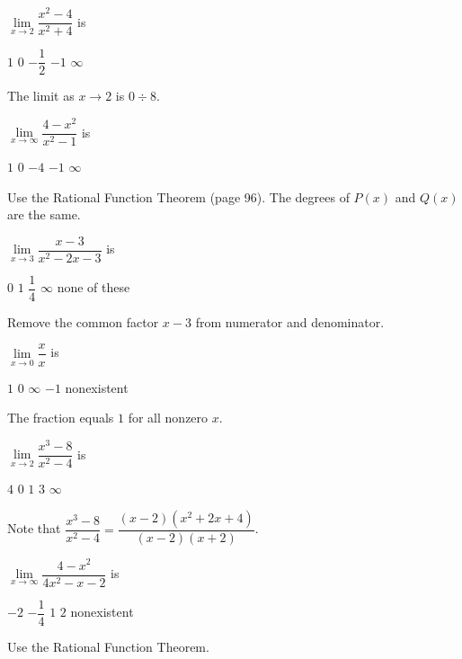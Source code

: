 \question
$\lim\limits_{x \to 2} \dfrac{x^{2}-4}{x^{2}+4}$ is
\begin{choices}
  \choice $1$
  \CorrectChoice $0$
  \choice $-\dfrac{1}{2}$
  \choice $-1$
  \choice $\infty$
\end{choices}
\begin{solution}
The limit as $x \rightarrow 2$ is $0 \div 8$.
\end{solution}

\question
$\lim\limits_{x \to \infty} \dfrac{4-x^{2}}{x^{2}-1}$ is
\begin{choices}
  \choice $1$
  \choice $0$
  \choice $-4$
  \CorrectChoice $-1$
  \choice $\infty$
\end{choices}
\begin{solution}
Use the Rational Function Theorem (page 96). The degrees of $P(x)$ and $Q(x)$ are the same.
\end{solution}

\question
$\lim\limits_{x \to 3} \dfrac{x-3}{x^{2}-2 x-3}$ is
\begin{choices}
  \choice $0$
  \choice $1$
  \CorrectChoice $\dfrac{1}{4}$
  \choice $\infty$
  \choice none of these
\end{choices}
\begin{solution}
Remove the common factor $x-3$ from numerator and denominator.
\end{solution}

\question
$\lim\limits_{x \to 0} \dfrac{x}{x}$ is
\begin{choices}
  \CorrectChoice $1$
  \choice $0$
  \choice $\infty$
  \choice $-1$
  \choice nonexistent
\end{choices}
\begin{solution}
The fraction equals $1$ for all nonzero $x$.
\end{solution}

\newpage

\question
$\lim\limits_{x \to 2} \dfrac{x^{3}-8}{x^{2}-4}$ is
\begin{choices}
  \choice $4$
  \choice $0$
  \choice $1$
  \CorrectChoice $3$
  \choice $\infty$
\end{choices}
\begin{solution}
Note that $\dfrac{x^{3}-8}{x^{2}-4}=\dfrac{(x-2)\left(x^{2}+2 x+4\right)}{(x-2)(x+2)}$.
\end{solution}

\question
$\lim\limits_{x \to \infty} \dfrac{4-x^{2}}{4 x^{2}-x-2}$ is
\begin{choices}
  \choice $-2$
  \CorrectChoice $-\dfrac{1}{4}$
  \choice $1$
  \choice $2$
  \choice nonexistent
\end{choices}
\begin{solution}
Use the Rational Function Theorem.
\end{solution}

